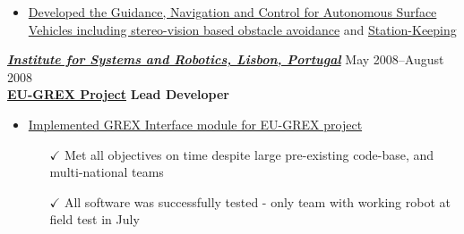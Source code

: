 \begin{itemize}
    \item \href{http://robotics.usc.edu/~ampereir/wordpress/?page_id=365}{Developed the Guidance, Navigation and Control for Autonomous Surface Vehicles  including stereo-vision based obstacle avoidance} and \href{http://robotics.usc.edu/~ampereir/wordpress/?page_id=373}{Station-Keeping}
 \iftoggle{detailedVersion}{\begin{itemize} \item[$\checkmark$] Took only 2 months to complete autonomy from RC-control to Mission control}{}
    \iftoggle{detailedVersion}{
   \begin{itemize}%
   \item[\tiny$\blacksquare$]  Required Control Systems, Robotics, Computer Networking, Computer Vision, Image Processing
   \iftoggle{detailedVersion}{
   \item[\tiny$\blacksquare$]  All code on robot written in C++ (Linux); OpenCV for vision. GUI written in C\# .Net (Windows); Prototyping in Matlab (Control Systems Toolbox, System Identification Toolbox) and Simulink}{}
    \end{itemize}
    }{}
    \iftoggle{detailedVersion}{\end{itemize}}{}
 \end{itemize}

{\sl \href{http://welcome.isr.ist.utl.pt/home/}{\textbf{Institute for Systems and Robotics, Lisbon, Portugal}}} \hfill May 2008--August 2008  \\[2pt]
\href{http://www.grex-project.eu/}{\textbf{EU-GREX Project}} \hfill   \textbf{ Lead Developer}
\begin{itemize}
 \item \href{http://robotics.usc.edu/~ampereir/wordpress/?page_id=397}{Implemented GREX Interface module for EU-GREX project}
   \begin{itemize} \item[$\checkmark$] Met all objectives on time despite large pre-existing code-base, and multi-national teams
   \item[$\checkmark$] All software was successfully tested - only team with working robot at field test in July
   \iftoggle{detailedVersion}{\begin{itemize}
   \item[\tiny$\blacksquare$]  Required Control Systems, Robotics, Ability to understand and implement complex algorithms quickly
   \item[\tiny$\blacksquare$]  Coded in Visual C++ .Net (Embedded Windows PC) and Matlab for prototyping
   \end{itemize}}{}
   \end{itemize}
   \end{itemize} 
   
